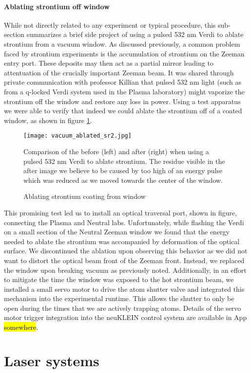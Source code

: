 \paragraph{Ablating strontium off window} \label{p:ablatingSr}
While not directly related to any experiment or typical procedure, this sub-section summarizes a brief side project of using a pulsed 532 nm Verdi to ablate strontium from a vacuum window.
As discussed previously, a common problem faced by strontium experiments is the accumulation of strontium on the Zeeman entry port. 
These deposits may then act as a partial mirror leading to attentuation of the crucially important Zeeman beam. 
It was shared through private communication with professor Killian that pulsed 532 nm light (such as from a q-locked Verdi system used in the Plasma laboratory) might vaporize the strontium off the window and restore any loss in power. 
Using a test apparatus we were able to verify that indeed we could ablate the strontium off of a coated window, as shown in figure \ref{fig:ablating_strontium}.
	\begin{figure}
		\centerline{
		\texttt{[image: vacuum\_ablated\_sr2.jpg]}}
		\caption{Ablating strontium coating from window}{Comparison of the before (left) and after (right) when using a pulsed 532 nm Verdi to ablate strontium. The residue visible in the after image we believe to be caused by too high of an energy pulse which was reduced as we moved towards the center of the window.}
		\label{fig:ablating_strontium}
	\end{figure}
This promising test led us to install an optical traversal port, shown in figure, connecting the Plasma and Neutral labs. 
Unfortunately, while flashing the Verdi on a small section of the Neutral Zeeman window we found that the energy needed to ablate the strontium was accompanied by deformation of the optical surface.
We discontinued the ablation upon observing this behavior as we did not want to distort the optical beam front of the Zeeman front.
Instead, we replaced the window upon breaking vacuum as previously noted.
Additionally, in an effort to mitigate the time the window was exposed to the hot strontium beam, we installed a small servo motor to drive the atom shutter valve and integrated this mechanism into the experimental runtime. 
This allows the shutter to only be open during the times that we are actively trapping atoms. 
Details of the servo motor trigger integration into the neuKLEIN control system are available in App \hl{somewhere}.

\section{Laser systems}\label{sec:laser_systems}

